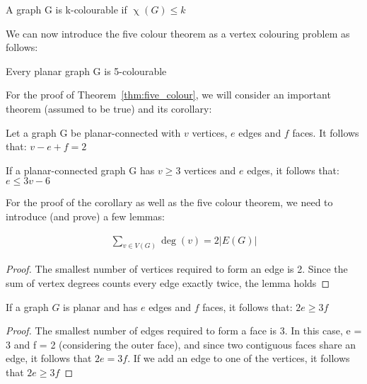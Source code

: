 \begin{definition}[k-colourability]
\label{def:k_colity}
A graph G is k-colourable if $\upchi(G) \leq k$
\end{definition}

We can now introduce the five colour theorem as a vertex colouring problem as follows:
\begin{theorem}
\label{thm:five_colour}
Every planar graph G is 5-colourable
\end{theorem}

For the proof of Theorem~\ref{thm:five_colour}, we will consider an important theorem (assumed to be true) and its corollary:
\begin{theorem}
\label{thm:euler_formula}
Let a graph G be planar-connected with $v$ vertices, $e$ edges and $f$ faces. It follows that: $v - e + f = 2$	
\end{theorem}

\begin{corollary}
\label{cor:euler_formula}
If a planar-connected graph G has $v \geq 3$ vertices and $e$ edges, it follows that: $e \leq 3v - 6$	
\end{corollary}

For the proof of the corollary as well as the five colour theorem, we need to introduce (and prove) a few lemmas:
\begin{lemma}
\label{lem:handshaking}
\begin{align*}
\sum_{v \in V(G)} \deg(v) = 2 |E(G)|	
\end{align*}
\end{lemma}
\begin{proof}
The smallest number of vertices required to form an edge is 2. Since the sum of vertex degrees counts every edge exactly twice, the lemma holds
\end{proof}

\begin{lemma}
\label{lem:edge_face}
If a graph $G$ is planar and has $e$ edges and $f$ faces, it follows that: $2e \geq 3f$
\end{lemma}
\begin{proof}
	The smallest number of edges required to form a face is 3. In this case, e = 3 and f = 2 (considering the outer face), and since two contiguous faces share an edge, it follows that $2e = 3f$. If we add an edge to one of the vertices, it follows that $2e \geq 3f$
\end{proof}

